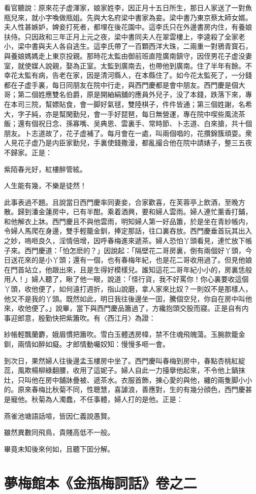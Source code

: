 看官聽說：原來花子虚渾家，娘家姓李，因正月十五日所生，那日人家送了一對魚瓶兒來，就小字喚做瓶姐。先與大名府梁中書家為妾。梁中書乃東京蔡太師女婿。夫人性甚嫉妒，婢妾打死者，都埋在後花園中。這李氏只在外邊書房内住，有養娘扶侍。只因政和三年正月上元之夜，梁中書同夫人在翠雲樓上，李逵殺了全家老小，梁中書與夫人各自逃生。這李氏帶了一百顆西洋大珠，二兩重一對鴉青寳石，與養娘媽媽走上東京投親。那時花太監由御前班直陞廣南鎮守，因侄男花子虚没妻室，就使媒人說親，娶為正室。太監到廣南去，也帶他到廣南。住了半年有餘。不幸花太監有病，告老在家，因是清河縣人，在本縣住了。如今花太監死了，一分錢都在子虚手裏，每日同朋友在院中行走，與西門慶都是會中朋友。西門慶是個大哥；第二個姓應雙名伯爵，原是開紬絹舖的應員外兒子，没了本錢，跌落下來，專在本司三院，幫嫖貼食，會一脚好氣毬，雙陸棋子，件件皆通；第三個姓謝，名希大，字子純，亦是幫閑勤兒，會一手好琵琶，每日無營運，專在院中喫些風流茶飯；還有個祝日念、孫寡嘴、吴典恩、雲裏手、常時節、卜志道、白來搶，共十個朋友。卜志道故了，花子虚補了。每月會在一處，叫兩個唱的，花攢錦簇頑耍。衆人見花子虚乃是内臣家勤兒，手裏使錢撒漫，都亂撮合他在院中請婊子，整三五夜不歸家。正是：
\begin{myquote}
紫陌春光好，紅樓醉管絃。

人生能有幾，不樂是徒然！
\end{myquote}

此事表過不題。且說當日西門慶率同妻妾，合家歡喜，在芙蓉亭上飲酒，至晚方散。歸到潘金蓮房中，已有半酣。乘着酒興，要和婦人雲雨。婦人連忙薰香打鋪，和他解衣上牀。西門慶且不與他雲雨，明知婦人第一好品簫，於是坐在青紗帳内，令婦人馬爬在身邊，雙手輕籠金釧，捧定那話，往口裏吞放。西門慶垂首玩其出入之妙，嗚咂良久，淫情倍增，因呼春梅進來遞茶。婦人恐怕丫頭看見，連忙放下帳子來。西門慶道：「怕怎麽的？」因說起：「隔壁花二哥房裏，倒有兩個好丫頭，今日送花來的是小丫頭；還有一個，也有春梅年紀，也是花二哥收用過了。但見他娘在門首站立，他跟出來，且是生得好模樣兒。誰知這花二哥年紀小小的，房裏恁般用人！」婦人聽了，瞅了他一眼，說道：「怪行貨，我不好罵你！你心裏要收這個丫頭，收他便了，如何遠打週折，指山說磨，拿人家來比奴？一則奴不是那樣人，他又不是我的丫頭。既然如此，明日我往後邊坐一囬，騰個空兒，你自在房中叫他來，收他便了。」說畢，當下與西門慶品簫過了，方纔抱頭交股而寢。正是自有内事迎郎意，殷勤快把紫簫吹。有〈西江月〉為證：
\begin{myquote}
紗帳輕飄蘭麝，娥眉慣把簫吹。雪白玉體透房幃，禁不住魂飛魄蕩。玉腕款籠金釧，兩情如醉如癡。才郎情動囑奴知：慢慢多咂一會。
\end{myquote}

到次日，果然婦人往後邊孟玉樓房中坐了。西門慶叫春梅到房中，春點杏桃紅綻蕊，風欺楊柳綠翻腰，收用了這妮子。婦人自此一力擡擧他起來，不令他上鍋抹灶，只叫他在房中舖牀疊被、遞茶水。衣服首飾，揀心愛的與他，纏的兩隻脚小小的。原來春梅比秋菊不同，性聰慧，喜謔浪，善應對，生的有幾分顔色，西門慶甚是寵他。秋菊為人濁蠢，不任事體，婦人打的是他。正是：
\begin{myquote}
燕雀池塘語話喧，皆因仁義說愚賢。

雖然異數同飛鳥，貴賤高低不一般。
\end{myquote}

畢竟未知後來何如，且聽下囬分解。

\part*{夢梅館本《金瓶梅詞話》卷之二}

